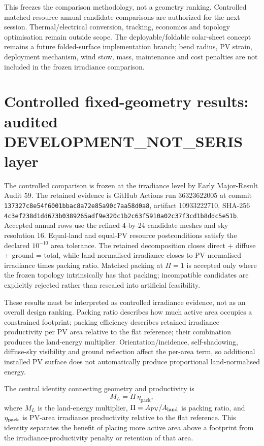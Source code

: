 \documentclass[11pt,a4paper]{article}
\begin{document}
This freezes the comparison methodology, not a geometry ranking. Controlled matched-resource annual candidate comparisons are authorized for the next session. Thermal/electrical conversion, tracking, economics and topology optimisation remain outside scope. The deployable/foldable solar-sheet concept remains a future folded-surface implementation branch; bend radius, PV strain, deployment mechanism, wind stow, mass, maintenance and cost penalties are not included in the frozen irradiance comparison.



\section{Controlled fixed-geometry results: audited DEVELOPMENT\_NOT\_SERIS layer}
The controlled comparison is frozen at the irradiance level by Early Major-Result Audit 59. The retained evidence is GitHub Actions run 36323622005 at commit \texttt{137327c8e54f6001bbac8a72e85a90c7aa58d0a8}, artifact 10933222710, SHA-256 \texttt{4c3ef238d1dd673b0389265adf9e320c1b2c63f5910a02c37f3cd1b8ddc5e51b}. Accepted annual rows use the refined 4-by-24 candidate meshes and sky resolution 16. Equal-land and equal-PV resource postconditions satisfy the declared $10^{-10}$ area tolerance. The retained decomposition closes direct + diffuse + ground = total, while land-normalised irradiance closes to PV-normalised irradiance times packing ratio. Matched packing at $\Pi=1$ is accepted only where the frozen topology intrinsically has that packing; incompatible candidates are explicitly rejected rather than rescaled into artificial feasibility.

These results must be interpreted as controlled irradiance evidence, not as an overall design ranking. Packing ratio describes how much active area occupies a constrained footprint; packing efficiency describes retained irradiance productivity per PV area relative to the flat reference; their combination produces the land-energy multiplier. Orientation/incidence, self-shadowing, diffuse-sky visibility and ground reflection affect the per-area term, so additional installed PV surface does not automatically produce proportional land-normalised energy.

The central identity connecting geometry and productivity is
\begin{equation}
M_L = \Pi\,\eta_{\mathrm{pack}},
\end{equation}
where $M_L$ is the land-energy multiplier, $\Pi=A_{\rm PV}/A_{\rm land}$ is packing ratio, and $\eta_{\rm pack}$ is PV-area irradiance productivity relative to the flat reference. This identity separates the benefit of placing more active area above a footprint from the irradiance-productivity penalty or retention of that area.
\end{document}
